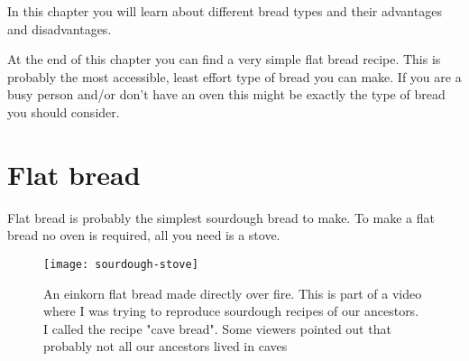 In this chapter you will learn about different bread types
and their advantages and disadvantages.

At the end of this chapter
you can find a very simple flat bread recipe. This is probably
the most accessible, least effort type of bread you can make.
If you are a busy person and/or don't have an oven this might
be exactly the type of bread you should consider.

\begin{table}[htp!]
  \centering
  \caption{\label{tab:bread-types-comparison}An overview of different bread types}
  \end{table}

\section{Flat bread}

Flat bread is probably the simplest sourdough bread to make.
To make a flat bread no oven is required, all you need is a stove.

\begin{figure}[!htb]
  \texttt{[image: sourdough-stove]}
  \caption{An einkorn flat bread made directly over fire. This
  is part of a video where I was trying to reproduce sourdough
  recipes of our ancestors. I called the recipe "cave bread". Some viewers
  pointed out that probably not all our ancestors lived in caves
  }
\end{figure}

